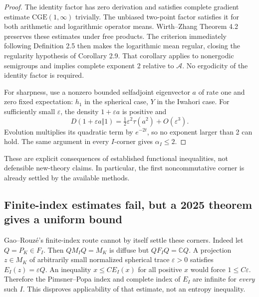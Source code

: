 \documentclass[11pt]{article}
\theoremstyle{remark}\newtheorem{remark}[definition]{Remark}
\newcommand{\C}{\mathbb{C}}
\begin{document}
\begin{proof}
The identity factor has zero derivation and satisfies complete gradient
estimate $\mathrm{CGE}(1,\infty)$ trivially. The unbiased two-point factor
satisfies it for both arithmetic and logarithmic operator means.
Wirth--Zhang Theorem 4.2 preserves these estimates under free products.
The criterion immediately following Definition 2.5 then makes the logarithmic
mean regular, closing the regularity hypothesis of Corollary 2.9.
That corollary applies to nonergodic semigroups and implies complete
exponent 2 relative to $\mathcal A$. No ergodicity of the identity factor
is required.

For sharpness, use a nonzero bounded selfadjoint eigenvector $a$ of rate
one and zero fixed expectation: $h_1$ in the spherical case, $Y$ in the
Iwahori case. For sufficiently small $\varepsilon$, the density
$1+\varepsilon a$ is positive and
\[
 D(1+\varepsilon a\Vert1)
 =\tfrac12\varepsilon^2\tau(a^2)+O(\varepsilon^3).
\]
Evolution multiplies its quadratic term by $e^{-2t}$, so no exponent
larger than 2 can hold. The same argument in every $I$-corner gives
$\alpha_I\leq2$.
\end{proof}
These are explicit consequences of established functional inequalities,
not defensible new-theory claims. In particular, the first noncommutative
corner is already settled by the available methods.

\subsection{Finite-index estimates fail, but a 2025 theorem gives a uniform bound}
Gao--Rouz\'e's finite-index route cannot by itself settle these corners.
Indeed let $Q=P_K\in F_I$. Then
$QM_IQ=M_K$ is diffuse but $QF_IQ=\C Q$. A projection $z\in M_K$
of arbitrarily small normalized spherical trace $\varepsilon>0$ satisfies
$E_I(z)=\varepsilon Q$. An inequality $x\leq C E_I(x)$ for all positive
$x$ would force $1\leq C\varepsilon$. Therefore the Pimsner--Popa index
and complete index of $E_I$ are infinite for \emph{every} such $I$.
This disproves applicability of that estimate, not an entropy inequality.
\end{document}
